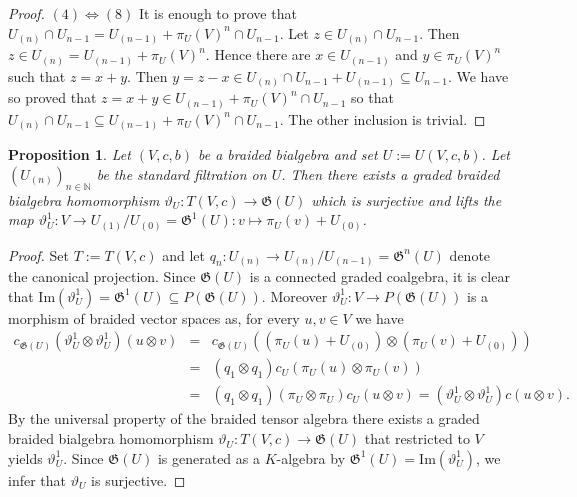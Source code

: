 \documentclass[english]{amsart}
\numberwithin{equation}{section}
\numberwithin{figure}{section}
\theoremstyle{plain}
\theoremstyle{definition}
\theoremstyle{definition}
\theoremstyle{remark}
\theoremstyle{remark}
\theoremstyle{plain}
\theoremstyle{plain}
\newtheorem{prop}[thm]{Proposition}
\theoremstyle{plain}
\begin{document}
\begin{proof}
$\left(4\right)\Leftrightarrow\left(8\right)$ It is enough to prove
that $U_{\left(n\right)}\cap U_{n-1}=U_{\left(n-1\right)}+\pi_{U}\left(V\right)^{n}\cap U_{n-1}$.
Let $z\in U_{\left(n\right)}\cap U_{n-1}$. Then $z\in U_{\left(n\right)}=U_{\left(n-1\right)}+\pi_{U}\left(V\right)^{n}$.
Hence there are $x\in U_{\left(n-1\right)}$ and $y\in\pi_{U}\left(V\right)^{n}$
such that $z=x+y$. Then $y=z-x\in U_{\left(n\right)}\cap U_{n-1}+U_{\left(n-1\right)}\subseteq U_{n-1}$.
We have so proved that $z=x+y\in U_{\left(n-1\right)}+\pi_{U}\left(V\right)^{n}\cap U_{n-1}$
so that $U_{\left(n\right)}\cap U_{n-1}\subseteq U_{\left(n-1\right)}+\pi_{U}\left(V\right)^{n}\cap U_{n-1}$.
The other inclusion is trivial.\end{proof}
\begin{prop}
\label{pro: induced filtration}Let $\left(V,c,b\right)$ be a braided
bialgebra and set $U:=U(V,c,b)$. Let $\left(U_{\left(n\right)}\right)_{n\in\mathbb{N}}$
be the standard filtration on $U$. Then there exists a graded braided
bialgebra homomorphism $\vartheta_{U}:T\left(V,c\right)\rightarrow\mathfrak{G}\left(U\right)$
which is surjective and lifts the map $\vartheta_{U}^{1}:V\rightarrow U_{\left(1\right)}/U_{\left(0\right)}=\mathfrak{G}^{1}\left(U\right):v\mapsto\pi_{U}\left(v\right)+U_{\left(0\right)}$. \end{prop}
\begin{proof}
Set $T:=T\left(V,c\right)$ and let $q_{n}:U_{\left(n\right)}\rightarrow U_{\left(n\right)}/U_{\left(n-1\right)}\mathfrak{=G}^{n}\left(U\right)$
denote the canonical projection. Since $\mathfrak{G}\left(U\right)$
is a connected graded coalgebra, it is clear that $\mathrm{Im}\left(\vartheta_{U}^{1}\right)=\mathfrak{G}^{1}\left(U\right)\subseteq P\left(\mathfrak{G}\left(U\right)\right)$.
Moreover $\vartheta_{U}^{1}:V\rightarrow P\left(\mathfrak{G}\left(U\right)\right)$
is a morphism of braided vector spaces as, for every $u,v\in V$ we
have\begin{eqnarray*}
c_{\mathfrak{G}\left(U\right)}\left(\vartheta_{U}^{1}\otimes\vartheta_{U}^{1}\right)\left(u\otimes v\right) & = & c_{\mathfrak{G}\left(U\right)}\left((\pi_{U}\left(u\right)+U_{\left(0\right)})\otimes (\pi_{U}\left(v\right)+U_{\left(0\right)})\right)\\
 & = & \left(q_{1}\otimes q_{1}\right)c_{U}\left(\pi_{U}\left(u\right)\otimes\pi_{U}\left(v\right)\right)\\
 & = & \left(q_{1}\otimes q_{1}\right)\left(\pi_{U}\otimes\pi_{U}\right)c_{U}\left(u\otimes v\right)=\left(\vartheta_{U}^{1}\otimes\vartheta_{U}^{1}\right)c\left(u\otimes v\right).\end{eqnarray*}
By the universal property of the braided tensor algebra there exists
a graded braided bialgebra homomorphism $\vartheta_{U}:T\left(V,c\right)\rightarrow\mathfrak{G}\left(U\right)$
that restricted to $V$ yields $\vartheta_{U}^{1}$. Since $\mathfrak{G}\left(U\right)$
is generated as a $K$-algebra by $\mathfrak{G}^{1}\left(U\right)=\mathrm{Im}\left(\vartheta_{U}^{1}\right)$,
we infer that $\vartheta_{U}$ is surjective.\end{proof}
\end{document}
